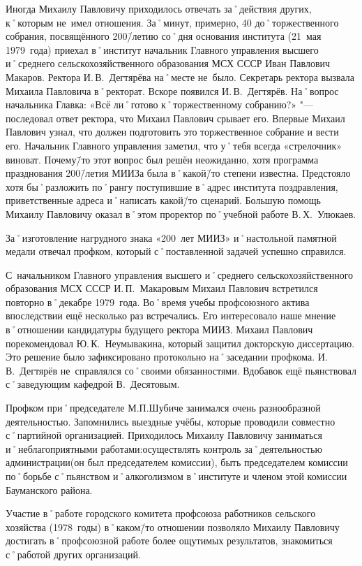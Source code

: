 Иногда Михаилу Павловичу приходилось отвечать за˚действия других, к˚которым не~имел отношения. За˚минут, примерно, 40 до˚торжественного собрания, посвящённого 200\=/летию со˚дня основания института (21~мая 1979~года) приехал в˚институт начальник Главного управления высшего и˚среднего сельскохозяйственного образования МСХ СССР Иван Павлович Макаров. Ректора И.\,В.~Дегтярёва на˚месте не~было. Секретарь ректора вызвала Михаила Павловича в˚ректорат. Вскоре появился И.\,В.~Дегтярёв. На˚вопрос начальника Главка: «Всё ли˚готово к˚торжественному собранию?» "--- последовал ответ ректора, что Михаил Павлович срывает его. Впервые Михаил Павлович узнал, что должен подготовить это торжественное собрание и вести его. Начальник Главного управления заметил, что у˚тебя всегда «стрелочник» виноват. Почему\=/то этот вопрос был решён неожиданно, хотя программа празднования 200\=/летия МИИЗа была в˚какой\=/то степени известна. Предстояло хотя бы˚разложить по˚рангу поступившие в˚адрес института поздравления, приветственные адреса и˚написать какой\=/то сценарий. Большую помощь Михаилу Павловичу оказал в˚этом проректор по˚учебной работе В.\,Х.~Улюкаев.

За˚изготовление нагрудного знака «200~лет МИИЗ» и˚настольной памятной медали отвечал профком, который с˚поставленной задачей успешно справился.

С~начальником Главного управления высшего и˚среднего сельскохозяйственного образования МСХ СССР И.\,П.~Макаровым Михаил Павлович встретился повторно в˚декабре 1979~года. Во˚время учебы профсоюзного актива впоследствии ещё несколько раз встречались. Его интересовало наше мнение в˚отношении кандидатуры будущего ректора МИИЗ. Михаил Павлович порекомендовал Ю.\,К.~Неумывакина, который защитил докторскую диссертацию. Это решение было зафиксировано протокольно на˚заседании профкома. И.\,В.~Дегтярёв не~справлялся со˚своими обязанностями. Вдобавок ещё пьянствовал с˚заведующим кафедрой В.~Десятовым.

Профком при˚председателе М.П.Шубиче занимался очень разнообразной деятельностью. Запомнились выездные учёбы, которые проводили совместно с˚партийной организацией. Приходилось Михаилу Павловичу заниматься и˚неблагоприятными работами:осуществлять контроль за˚деятельностью администрации(он был председателем комиссии), быть председателем комиссии по˚борьбе с˚пьянством и˚алкоголизмом в˚институте и членом этой комиссии Бауманского района.

Участие в˚работе городского комитета профсоюза работников сельского хозяйства (1978~годы) в˚каком\=/то отношении позволяло Михаилу Павловичу достигать в˚профсоюзной работе более ощутимых результатов, знакомиться с˚работой других организаций.






